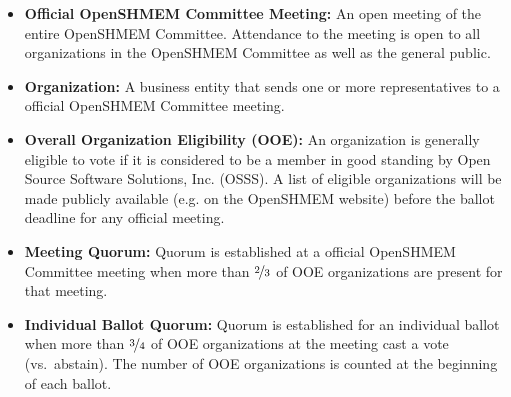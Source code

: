 \begin{itemize}
\item {\bf Official OpenSHMEM Committee Meeting:} An open meeting of the entire
  OpenSHMEM Committee.  Attendance to the meeting is open to
  all organizations in the OpenSHMEM Committee as well as the general public.

\item {\bf Organization:} A business entity that sends one or more
  representatives to a official OpenSHMEM Committee meeting.

\item {\bf Overall Organization Eligibility (OOE):} An organization is
  generally eligible to vote if it
  is considered to be a member in good
  standing by Open Source Software Solutions, Inc. (OSSS).  A list of eligible
  organizations will be made publicly available (e.g. on the OpenSHMEM website)
  before the ballot deadline for any official meeting.

\item {\bf Meeting Quorum:} Quorum is established at a official OpenSHMEM
  Committee meeting when more than $\nicefrac{2}{3}$ of OOE organizations
  are present for that meeting.

\item {\bf Individual Ballot Quorum:} Quorum is established for an
  individual ballot when more than $\nicefrac{3}{4}$ of OOE
  organizations at the meeting cast a vote (vs.\ abstain).  The number
  of OOE organizations is counted at the beginning of each ballot.
\end{itemize}
